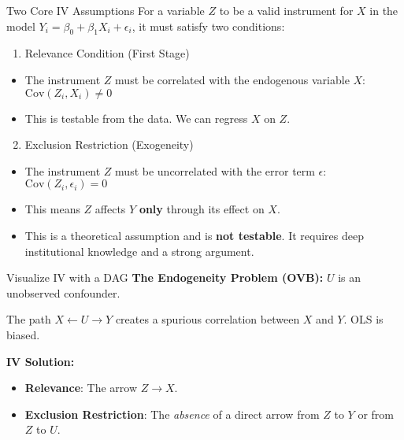 \documentclass[
  ignorenonframetext,
  aspectratio=169]{beamer}
\providecommand{\tightlist}{%
  \setlength{\itemsep}{0pt}\setlength{\parskip}{0pt}}
\newcommand{\Cov}{\text{Cov}}
\begin{document}
\begin{frame}{Two Core IV Assumptions}
\label{two-core-iv-assumptions}
For a variable \(Z\) to be a valid instrument for \(X\) in the model
\(Y_i = \beta_0 + \beta_1 X_i + \epsilon_i\), it must satisfy two
conditions:

\begin{enumerate}
\tightlist
\item
  Relevance Condition (First Stage)
\end{enumerate}

\begin{itemize}
\tightlist
\item
  The instrument \(Z\) must be correlated with the endogenous variable
  \(X\): \(\Cov(Z_i, X_i) \neq 0\)
\item
  This is testable from the data. We can regress \(X\) on \(Z\).
\end{itemize}

\begin{enumerate}
\setcounter{enumi}{1}
\tightlist
\item
  Exclusion Restriction (Exogeneity)
\end{enumerate}

\begin{itemize}
\tightlist
\item
  The instrument \(Z\) must be uncorrelated with the error term
  \(\epsilon\): \(\Cov(Z_i, \epsilon_i) = 0\)
\item
  This means \(Z\) affects \(Y\) \textbf{only} through its effect on
  \(X\).
\item
  This is a theoretical assumption and is \textbf{not testable}. It
  requires deep institutional knowledge and a strong argument.
\end{itemize}
\end{frame}

\begin{frame}{Visualize IV with a DAG}
\label{visualize-iv-with-a-dag}
\textbf{The Endogeneity Problem (OVB):} \(U\) is an unobserved
confounder.

The path \(X \leftarrow U \rightarrow Y\) creates a spurious correlation
between \(X\) and \(Y\). OLS is biased.

\textbf{IV Solution:}

\begin{itemize}
\tightlist
\item
  \textbf{Relevance}: The arrow \(Z \rightarrow X\).
\item
  \textbf{Exclusion Restriction}: The \textit{absence} of a direct arrow
  from \(Z\) to \(Y\) or from \(Z\) to \(U\).
\end{itemize}
\end{frame}
\end{document}
